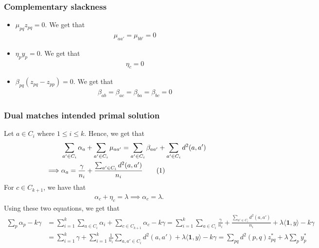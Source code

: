 \documentclass[12pt]{article}
\newcommand{\mb}{\mathbf}
\newcommand\numberthis{\addtocounter{equation}{1}\tag{\theequation}}
\begin{document}
\subsubsection*{Complementary slackness}
\begin{itemize}
  \item $\mu_{pq}z_{pq} = 0$. We get that
  \begin{align}
    &\mu_{aa'} = \mu_{bb'} = 0 \label{eqn:muCS}
  \end{align}
  \item $\eta_{p}y_{p} = 0$. We get that
  \begin{align}
    &\eta_{c} = 0 \label{a-eqn:etaCS}
  \end{align}
  \item $\beta_{pq}(z_{pq}-z_{pp}) = 0$. We get that
  \begin{align}
    &\beta_{ab} = \beta_{ac} = \beta_{ba} = \beta_{bc} = 0 \label{a-eqn:betaCS}
  \end{align}  
\end{itemize}

\subsubsection*{Dual matches intended primal solution}
Let $a \in C_i$ where $1 \le i \le k$. Hence, we get that 
\begin{align*}
  &\sum_{a' \in C_i}\alpha_{a} + \sum_{a'\in C_i}\mu_{aa'} = \sum_{a' \in C_i}\beta_{aa'}+ \sum_{a' \in C_i}d^2(a, a')\\
  \implies&\alpha_a = \frac{\gamma}{n_i} + \frac{\sum_{a'\in C_i}d^2(a, a')}{n_i}\numberthis\label{a-eqn:alphaA}
\end{align*}
For $c \in C_{k+1}$, we have that
\begin{align*}
  &\alpha_c + \eta_c= \lambda \implies \alpha_c = \lambda.
\end{align*}
Using these two equations, we get that
\begin{align*}
  \sum_p \alpha_p - k\gamma &= \sum_{i=1}^k \sum_{a \in C_i} \alpha_i + \sum_{c \in C_{k+1}}\alpha_c - k\gamma = \sum_{i=1}^k \sum_{a \in C_i} \frac{\gamma}{n_i} + \frac{\sum_{a'\in C_i}d^2(a, a')}{n_i} + \lambda \langle \mb 1, y\rangle - k\gamma\\
  &= \sum_{i=1}^k \gamma + \sum_{i=1}^k \frac{1}{n_i}\sum_{a, a' \in C_i}d^2(a, a') + \lambda \langle \mb 1, y\rangle - k\gamma = \sum_{pq} d^2(p, q)z^*_{pq} + \lambda\sum_{p}y^*_{p}
\end{align*}
\end{document}
